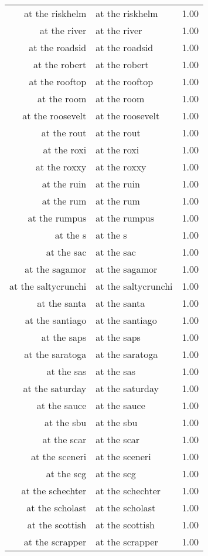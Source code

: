 \begin{table}[ht]
\begin{tabular}{rlr}
  at the riskhelm & at the riskhelm & 1.00 \\ 
  at the river & at the river & 1.00 \\ 
  at the roadsid & at the roadsid & 1.00 \\ 
  at the robert & at the robert & 1.00 \\ 
  at the rooftop & at the rooftop & 1.00 \\ 
  at the room & at the room & 1.00 \\ 
  at the roosevelt & at the roosevelt & 1.00 \\ 
  at the rout & at the rout & 1.00 \\ 
  at the roxi & at the roxi & 1.00 \\ 
  at the roxxy & at the roxxy & 1.00 \\ 
  at the ruin & at the ruin & 1.00 \\ 
  at the rum & at the rum & 1.00 \\ 
  at the rumpus & at the rumpus & 1.00 \\ 
  at the s & at the s & 1.00 \\ 
  at the sac & at the sac & 1.00 \\ 
  at the sagamor & at the sagamor & 1.00 \\ 
  at the saltycrunchi & at the saltycrunchi & 1.00 \\ 
  at the santa & at the santa & 1.00 \\ 
  at the santiago & at the santiago & 1.00 \\ 
  at the saps & at the saps & 1.00 \\ 
  at the saratoga & at the saratoga & 1.00 \\ 
  at the sas & at the sas & 1.00 \\ 
  at the saturday & at the saturday & 1.00 \\ 
  at the sauce & at the sauce & 1.00 \\ 
  at the sbu & at the sbu & 1.00 \\ 
  at the scar & at the scar & 1.00 \\ 
  at the sceneri & at the sceneri & 1.00 \\ 
  at the scg & at the scg & 1.00 \\ 
  at the schechter & at the schechter & 1.00 \\ 
  at the scholast & at the scholast & 1.00 \\ 
  at the scottish & at the scottish & 1.00 \\ 
  at the scrapper & at the scrapper & 1.00 \\ 

\end{tabular}
\end{table}

